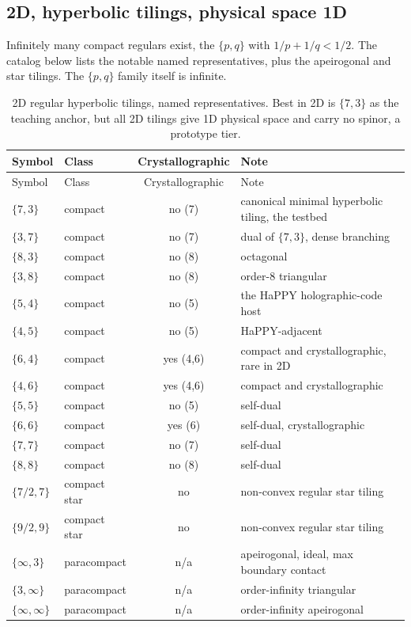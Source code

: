 \subsection{2D, hyperbolic tilings, physical space 1D}

Infinitely many compact regulars exist, the $\{p,q\}$ with $1/p + 1/q < 1/2$. The catalog below lists the notable
named representatives, plus the apeirogonal and star tilings. The $\{p,q\}$ family itself is infinite.

{\small
\begin{longtable}{l l c p{3.0in}}
\caption{2D regular hyperbolic tilings, named representatives. Best in 2D is $\{7,3\}$ as the teaching anchor, but
all 2D tilings give 1D physical space and carry no spinor, a prototype tier.}
\label{tab:catalog-2d}\\
\toprule
Symbol & Class & Crystallographic & Note \\
\midrule
\endfirsthead
\toprule
Symbol & Class & Crystallographic & Note \\
\midrule
\endhead
\bottomrule
\endfoot
$\{7,3\}$ & compact & no (7) & canonical minimal hyperbolic tiling, the testbed \\
$\{3,7\}$ & compact & no (7) & dual of $\{7,3\}$, dense branching \\
$\{8,3\}$ & compact & no (8) & octagonal \\
$\{3,8\}$ & compact & no (8) & order-8 triangular \\
$\{5,4\}$ & compact & no (5) & the HaPPY holographic-code host \\
$\{4,5\}$ & compact & no (5) & HaPPY-adjacent \\
$\{6,4\}$ & compact & yes (4,6) & compact and crystallographic, rare in 2D \\
$\{4,6\}$ & compact & yes (4,6) & compact and crystallographic \\
$\{5,5\}$ & compact & no (5) & self-dual \\
$\{6,6\}$ & compact & yes (6) & self-dual, crystallographic \\
$\{7,7\}$ & compact & no (7) & self-dual \\
$\{8,8\}$ & compact & no (8) & self-dual \\
$\{7/2,7\}$ & compact star & no & non-convex regular star tiling \\
$\{9/2,9\}$ & compact star & no & non-convex regular star tiling \\
$\{\infty,3\}$ & paracompact & n/a & apeirogonal, ideal, max boundary contact \\
$\{3,\infty\}$ & paracompact & n/a & order-infinity triangular \\
$\{\infty,\infty\}$ & paracompact & n/a & order-infinity apeirogonal \\
\end{longtable}}

